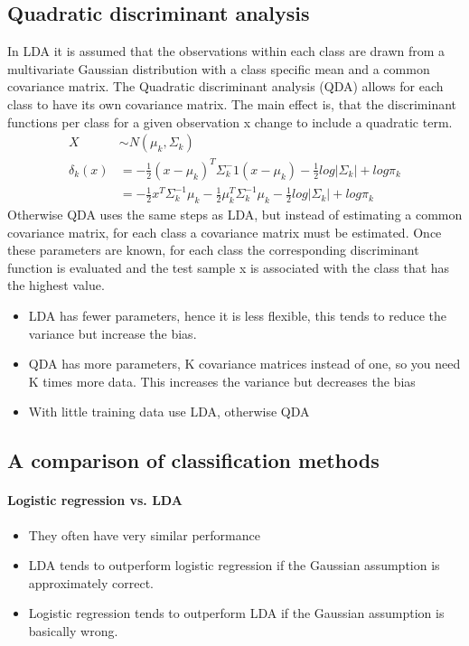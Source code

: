 \documentclass[../document.tex]{subfiles}
\begin{document}
	\subsection{Quadratic discriminant analysis}
	In LDA it is assumed that the observations within each class are drawn from a multivariate Gaussian distribution with a class specific mean and a common covariance matrix. The Quadratic discriminant analysis (QDA) allows for each class to have its own covariance matrix. The main effect is, that the discriminant functions per class for a given observation x change to include a quadratic term.
	\begin{equation}
	\begin{split}
		X&\sim N(\mu_{k},\Sigma_{k})\\
		\delta_{k}(x)&=-\frac{1}{2}(x-\mu_{k})^T\Sigma_{k}^-1(x-\mu_{k})-\frac{1}{2}log|\Sigma_{k}|+log\pi_{k}\\
		&=-\frac{1}{2}x^T\Sigma_{k}^{-1}\mu_{k}-\frac{1}{2}\mu_{k}^T\Sigma_{k}^{-1}\mu_{k}-\frac{1}{2}log|\Sigma_{k}|+log\pi_{k}
	\end{split}
	\end{equation}
	Otherwise QDA uses the same steps as LDA, but instead of estimating a common covariance matrix, for each class a covariance matrix must be estimated. Once these parameters are known, for each class the corresponding discriminant function is evaluated and the test sample x is associated with the class that has the highest value.\\
	\begin{itemize}
		\item LDA has fewer parameters, hence it is less flexible, this tends to reduce the variance but increase the bias.
		\item QDA has more parameters, K covariance matrices instead of one, so you need K times more data. This increases the variance but decreases the bias
		\item With little training data use LDA, otherwise QDA
	\end{itemize}
	\subsection{A comparison of classification methods}
	\paragraph{Logistic regression vs. LDA}
	\begin{itemize}
		\item They often have very similar performance
		\item LDA tends to outperform logistic regression if the Gaussian assumption is approximately correct.
		\item Logistic regression tends to outperform LDA if the Gaussian assumption is basically wrong.
	\end{itemize}
\end{document}
